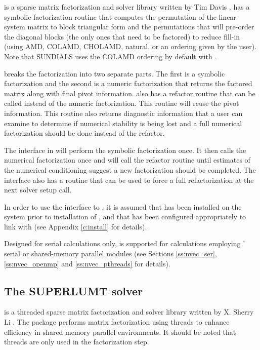 {\klu} is a sparse matrix factorization and solver library written by Tim
Davis \cite{KLU_site,DaPa:10}.  
{\klu} has a symbolic factorization routine that computes the permutation of 
the linear system matrix to block triangular form and the permutations that will 
pre-order the diagonal blocks (the only ones that need to be factored) to reduce 
fill-in (using AMD, COLAMD, CHOLAMD, natural, or an ordering given by the user).  
Note that SUNDIALS uses the COLAMD ordering by default with {\klu}.

{\klu} breaks the factorization into two separate parts.  The first is a symbolic
factorization and the second is a numeric 
factorization that returns the factored matrix along with final pivot information.  
{\klu} also has a refactor routine that can be called instead of the numeric 
factorization.  This routine will reuse the pivot information.  This routine 
also returns diagnostic information that a user can examine to determine if 
numerical stability is being lost and a full numerical factorization should 
be done instead of the refactor.  

The {\klu} interface in {\sundials} will perform the symbolic factorization once.
It then calls the numerical factorization once and will call the refactor routine
until estimates of the numerical conditioning suggest a new factorization 
should be completed.  The {\klu} interface also has a  routine that 
can be used to force a full refactorization at the next solver setup call.

In order to use the {\sundials} interface to {\klu}, it is
assumed that {\klu} has been installed on the system prior to
installation of {\sundials}, and that {\sundials} has been configured
appropriately to link with {\klu} (see Appendix \ref{c:install} for details).

Designed for serial calculations only, {\klu} is supported for
calculations employing {\sundials}' serial or shared-memory parallel
{\nvector} modules (see Sections \ref{ss:nvec_ser}, \ref{ss:nvec_openmp}
and \ref{ss:nvec_pthreads} for details).

\subsection{The SUPERLUMT solver}\label{ss:superlumt}

{\superlumt} is a threaded sparse matrix factorization and solver
library written by X. Sherry Li \cite{SuperLUMT_site,Li:05,DGL:99}.  
The package performs matrix factorization using threads to enhance efficiency
in shared memory parallel environments.  It should be noted that threads are
only used in the factorization step.

